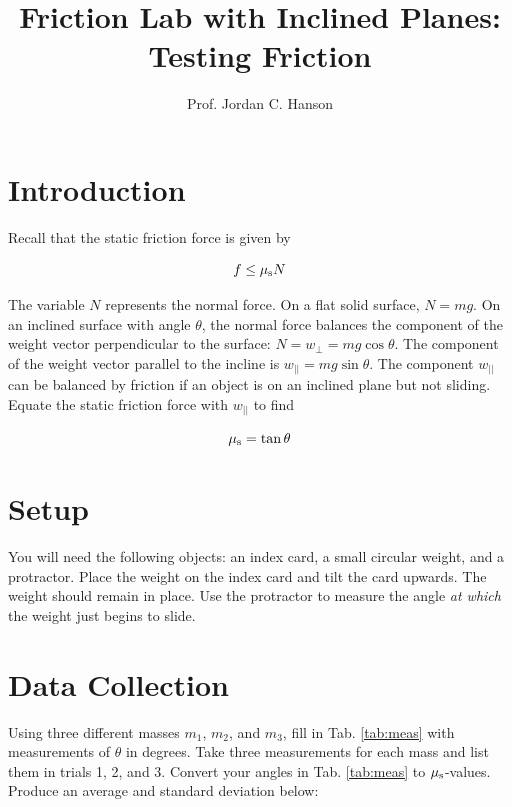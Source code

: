 \documentclass{article}
\begin{document}
\title{Friction Lab with Inclined Planes: Testing Friction}
\author{Prof. Jordan C. Hanson}

\maketitle

\section{Introduction}

Recall that the static friction force is given by

\begin{equation}
f \leq \mu_{\rm s} N
\end{equation}

The variable $N$ represents the normal force.  On a flat solid surface, $N = mg$.  On an inclined surface with angle $\theta$, the normal force balances the component of the weight vector perpendicular to the surface: $N = w_{\perp} = mg \cos\theta$.  The component of the weight vector parallel to the incline is $w_{||} = mg \sin\theta$.  The component $w_{||}$ can be balanced by friction if an object is on an inclined plane but not sliding.  Equate the static friction force with $w_{||}$ to find

\begin{equation}
\mu_{\rm s} = \tan\theta
\end{equation}

\section{Setup}

You will need the following objects: an index card, a small circular weight, and a protractor.  Place the weight on the index card and tilt the card upwards. The weight should remain in place.  Use the protractor to measure the angle \textit{at which} the weight just begins to slide.

\section{Data Collection}

Using three different masses $m_1$, $m_2$, and $m_3$, fill in Tab. \ref{tab:meas} with measurements of $\theta$ in degrees.  Take three measurements for each mass and list them in trials 1, 2, and 3.  Convert your angles in Tab. \ref{tab:meas} to $\mu_{\rm s}$-values.  Produce an average and standard deviation below: \\ \\
\end{document}
